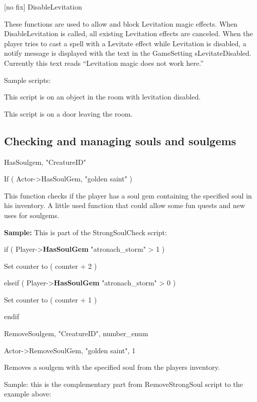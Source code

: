 {[}no fix{]} DisableLevitation

These functions are used to allow and block Levitation magic effects.
When DisableLevitation is called, all existing Levitation effects are
canceled. When the player tries to cast a spell with a Levitate effect
while Levitation is disabled, a notify message is displayed with the
text in the GameSetting sLevitateDisabled. Currently this text reads
``Levitation magic does not work here.''

Sample scripts:

This script is on an object in the room with levitation disabled.



This script is on a door leaving the room.



\hypertarget{checking-and-managing-souls-and-soulgems}{%
\subsection{Checking and managing souls and
soulgems}\label{checking-and-managing-souls-and-soulgems}}

HasSoulgem, "CreatureID"

If ( Actor-\textgreater HasSoulGem, "golden saint" )

This function checks if the player has a soul gem containing the
specified soul in his inventory. A little used function that could allow
some fun quests and new uses for soulgems.

\textbf{Sample:} This is part of the StrongSoulCheck script:

if ( Player-\textgreater{}\textbf{HasSoulGem} "atronach\_storm"
\textgreater{} 1 )

Set counter to ( counter + 2 )

elseif ( Player-\textgreater{}\textbf{HasSoulGem} "atronach\_storm"
\textgreater{} 0 )

Set counter to ( counter + 1 )

endif

RemoveSoulgem, "CreatureID", number\_enum

Actor-\textgreater RemoveSoulGem, "golden saint", 1

Removes a soulgem with the specified soul from the players inventory.

Sample: this is the complementary part from RemoveStrongSoul script to
the example above:

